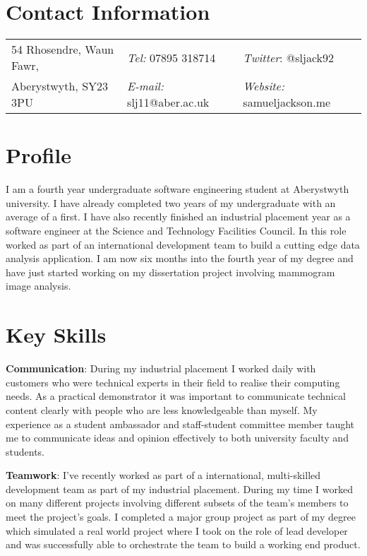 \documentclass[margin,line]{res}
\begin{document}

\begin{resume}
\section{\sc Contact Information}
\vspace{.05in}
\begin{tabular}{@{}p{2in}p{2in}p{2in}}
54 Rhosendre, Waun Fawr,             & {\it Tel:}  07895 318714 & {\it Twitter}: @sljack92 \\
Aberystwyth, SY23 3PU & {\it E-mail:}  slj11@aber.ac.uk & {\it Website:} samueljackson.me \\
\end{tabular}

\section{\sc Profile}
I am a fourth year undergraduate software engineering student at Aberystwyth university. I have already completed two years of my undergraduate with an average of a first. I have also recently finished an industrial placement year as a software engineer at the Science and Technology Facilities Council. In this role worked as part of an international development team to build a cutting edge data analysis application. I am now six months into the fourth year of my degree and have just started working on my dissertation project involving mammogram image analysis.

\section{\sc Key Skills}

{\bf Communication}: During my industrial placement I worked daily with customers who were technical experts in their field to realise their computing needs. As a practical demonstrator it was important to communicate technical content clearly with people who are less knowledgeable than myself. My experience as a student ambassador and staff-student committee member taught me to communicate ideas and opinion effectively to both university faculty and students.

{\bf Teamwork}: I've recently worked as part of a international, multi-skilled development team as part of my industrial placement. During my time I worked on many different projects involving different subsets of the team's members to meet the project's goals. I completed a major group project as part of my degree which simulated a real world project where I took on the role of lead developer and was successfully able to orchestrate the team to build a working end product.


\end{resume}
\end{document}
